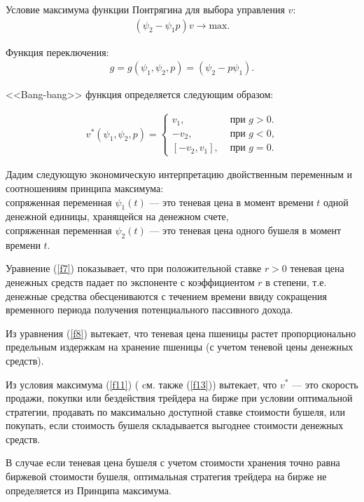 Условие максимума функции Понтрягина для выбора управления ${v}$: 
\begin{gather}
    (\psi_{2} - \psi_{1} p)v\to \mathrm{max} \label{f11}.
\end{gather} 

Функция переключения:
\begin{align}
g = g(\psi_1 , \psi_2, p)=(\psi_{2} - p \psi_{1}).
\end{align} 


<<Bang-bang>>    функция определяется следующим образом:


\begin{align} \label{f13}
v^*(\psi_1 , \psi_2, p) = 
 \begin{cases}
   v_{1}, & \textrm{ при $g>0$.}\\
   -v_{2}, &  \textrm{ при $g<0$,}\\
   [-v_{2},v_{1}], & \textrm{ при $g=0$}.
 \end{cases}
\end{align}

Дадим следующую экономическую интерпретацию двойственным переменным и соотношениям принципа максимума:\\
 сопряженная переменная $ \psi_1(t) $ --- это теневая цена в момент времени ${t}$ одной денежной единицы, хранящейся на денежном счете,\\
 сопряженная переменная $ \psi_2(t) $ --- это теневая цена одного бушеля в момент времени ${t}$.
 
 
Уравнение (\ref{f7}) показывает, что при положительной ставке $ r>0 $ теневая цена денежных средств падает по экспоненте с коэффициентом $r$ в степени, т.е.  денежные средства обесцениваются с течением времени ввиду сокращения временного периода получения потенциального пассивного дохода.


Из уравнения (\ref{f8}) вытекает, что теневая цена пшеницы растет пропорционально предельным издержкам на хранение пшеницы (с учетом теневой цены денежных средств).


Из условия максимума (\ref{f11}) \big( cм. также (\ref{f13})\big) вытекает, что  ${v^*}$ --- это скорость продажи, покупки или бездействия трейдера на бирже при условии оптимальной стратегии, продавать по максимально доступной  ставке стоимости бушеля, или покупать, если стоимость бушеля складывается выгоднее стоимости денежных средств.


В случае если теневая цена бушеля с учетом стоимости хранения точно равна биржевой стоимости бушеля, оптимальная стратегия трейдера на бирже не определяется из Принципа максимума.


